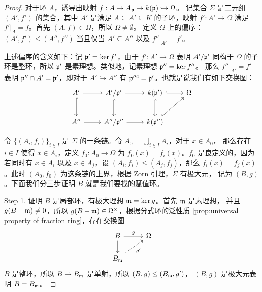 \begin{proof}
  对于环 $A$，诱导出映射 $f:A\to A_{\mathfrak{p}}\to k(\mathfrak{p})\hookrightarrow\Omega$。
  记集合 $\Sigma$ 是二元组 $(A',f')$ 的集合，其中 $A'$ 是满足 $A\subseteq A'\subseteq K$
  的子环，映射 $f':A'\to\Omega$ 满足 $f'|_A=f$。首先 $(A,f)\in\Omega$，所以 $\Omega\neq\emptyset$。
  定义 $\Omega$ 上的偏序：$(A',f')\leq (A'',f'')$ 当且仅当 $A'\subseteq A''$ 以及 $f''|_{A'}=f'$。

  上述偏序的含义如下：记 $\mathfrak{p}'=\ker f'$，由于 $f':A'\to\Omega$ 表明 $A'/\mathfrak{p}'$
  同构于 $\Omega$ 的子环是整环，所以 $\mathfrak{p}'$ 是素理想。类似地，记素理想 $\mathfrak{p}''=\ker f''$。
  那么 $f''|_{A'}=f'$ 表明 $\mathfrak{p}''\cap A'=\mathfrak{p}'$，即对于 $A'\hookrightarrow A''$ 有
  $\mathfrak{p}''^{c}=\mathfrak{p}'$。也就是说我们有如下交换图：
  \[
    \begin{tikzcd}[row sep=2.4em]
      A'\arrow[r]\arrow[d,hookrightarrow]
      & A'/\ideal p'\arrow[r]\arrow[d,hookrightarrow] 
      & k(\ideal p')\arrow[r,hookrightarrow]\arrow[d,hookrightarrow] 
      & \Omega \\
      A''\arrow[r] & A''/\ideal p''\arrow[r] & k(\ideal p'')\arrow[ur,hookrightarrow] & 
    \end{tikzcd}  
  \]

  令 $\{(A_i,f_i)\}_{i\in I}$ 是 $\Sigma$ 的一条链。令 $A_0=\bigcup_{i\in I}A_i$，对于 $x\in A_0$，
  那么存在 $i\in I$ 使得 $x\in A_i$，定义 $f_0:A_0\to\Omega$ 为 $f_0(x)=f_i(x)$。$f_0$
  是良定义的，因为若同时有 $x\in A_i$ 以及 $x\in A_j$，设 $(A_i,f_i)\leq (A_j,f_j)$，那么
  $f_i(x)=f_j(x)$。此时 $(A_0,f_0)$ 为这条链的上界，根据 Zorn 引理，$\Sigma$ 有极大元，
  记为 $(B,g)$。下面我们分三步证明 $B$ 就是我们要找的赋值环。

  Step 1. 证明 $B$ 是局部环，有极大理想 $\mathfrak{m}=\ker g$。首先 $\mathfrak{m}$ 是素理想，
  并且 $g(B-\mathfrak{m})\neq 0$，所以 $g(B-\mathfrak{m})\in\Omega^\times$，根据分式环的泛性质
  \ref{prop:universal property of fraction ring}，存在交换图
  \[
    \begin{tikzcd}
      B\arrow[r,"g"]\arrow[d] & \Omega \\
      B_{\ideal m}\arrow[ur,dashed,"g'"'] &
    \end{tikzcd}  
  \]
  $B$ 是整环，所以 $B\to B_{\mathfrak{m}}$ 是单射，所以 $(B,g)\leq (B_{\mathfrak{m}},g')$，
  $(B,g)$ 是极大元表明 $B=B_{\mathfrak{m}}$。


\end{proof}
